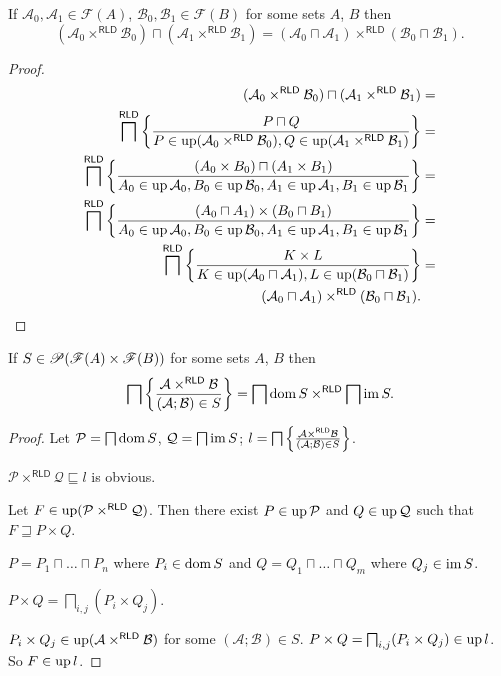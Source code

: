 \begin{thm}
If $\mathcal{A}_{0},\mathcal{A}_{1}\in\mathscr{F}(A)$, $\mathcal{B}_{0},\mathcal{B}_{1}\in\mathscr{F}(B)$
for some sets $A$, $B$ then
\[
\ensuremath{(\mathcal{A}_{0}\times^{\mathsf{RLD}}\mathcal{B}_{0})\sqcap(\mathcal{A}_{1}\times^{\mathsf{RLD}}\mathcal{B}_{1})=(\mathcal{A}_{0}\sqcap\mathcal{A}_{1})\times^{\mathsf{RLD}}(\mathcal{B}_{0}\sqcap\mathcal{B}_{1}).}
\]
\end{thm}
\begin{proof}
~
\begin{align*}
(\mathcal{A}_{0}\times^{\mathsf{RLD}}\mathcal{B}_{0})\sqcap(\mathcal{A}_{1}\times^{\mathsf{RLD}}\mathcal{B}_{1}) & =\\
\bigsqcap^{\mathsf{RLD}}\left\{ \frac{P\sqcap Q}{P\in\operatorname{up}(\mathcal{A}_{0}\times^{\mathsf{RLD}}\mathcal{B}_{0}),Q\in\operatorname{up}(\mathcal{A}_{1}\times^{\mathsf{RLD}}\mathcal{B}_{1})}\right\} & =\\
\bigsqcap^{\mathsf{RLD}}\left\{ \frac{(A_{0}\times B_{0})\sqcap(A_{1}\times B_{1})}{A_{0}\in\operatorname{up}\mathcal{A}_{0},B_{0}\in\operatorname{up}\mathcal{B}_{0},A_{1}\in\operatorname{up}\mathcal{A}_{1},B_{1}\in\operatorname{up}\mathcal{B}_{1}}\right\} & =\\
\bigsqcap^{\mathsf{RLD}}\left\{ \frac{(A_{0}\sqcap A_{1})\times(B_{0}\sqcap B_{1})}{A_{0}\in\operatorname{up}\mathcal{A}_{0},B_{0}\in\operatorname{up}\mathcal{B}_{0},A_{1}\in\operatorname{up}\mathcal{A}_{1},B_{1}\in\operatorname{up}\mathcal{B}_{1}}\right\} & =\\
\bigsqcap^{\mathsf{RLD}}\left\{ \frac{K\times L}{K\in\operatorname{up}(\mathcal{A}_{0}\sqcap\mathcal{A}_{1}),L\in\operatorname{up}(\mathcal{B}_{0}\sqcap\mathcal{B}_{1})}\right\} & =\\
(\mathcal{A}_{0}\sqcap\mathcal{A}_{1})\times^{\mathsf{RLD}}(\mathcal{B}_{0}\sqcap\mathcal{B}_{1}).
\end{align*}
\end{proof}
\begin{thm}
\label{meet-rld-prod}If $S\in\mathscr{P}(\mathscr{F}(A)\times\mathscr{F}(B))$
for some sets $A$, $B$ then
\[
\bigsqcap\left\{ \frac{\mathcal{A}\times^{\mathsf{RLD}}\mathcal{B}}{(\mathcal{A};\mathcal{B})\in S}\right\}=\bigsqcap\operatorname{dom} S\times^{\mathsf{RLD}}\bigsqcap\operatorname{im} S.
\]
\end{thm}
\begin{proof}
Let $\mathcal{P}=\bigsqcap\operatorname{dom} S$, $\mathcal{Q}=\bigsqcap\operatorname{im} S$;
$l=\bigsqcap\left\{ \frac{\mathcal{A}\times^{\mathsf{RLD}}\mathcal{B}}{(\mathcal{A};\mathcal{B})\in S}\right\}$.

$\mathcal{P}\times^{\mathsf{RLD}}\mathcal{Q}\sqsubseteq l$ is obvious.

Let $F\in\operatorname{up}(\mathcal{P}\times^{\mathsf{RLD}}\mathcal{Q})$. Then
there exist $P\in\operatorname{up}\mathcal{P}$ and $Q\in\operatorname{up}\mathcal{Q}$ such that
$F\sqsupseteq P\times Q$.

$P=P_{1}\sqcap\dots\sqcap P_{n}$ where $P_{i}\in\operatorname{dom} S$ and $Q=Q_{1}\sqcap\dots\sqcap Q_{m}$
where $Q_{j}\in\operatorname{im} S$.

$P\times Q=\bigsqcap_{i,j}(P_{i}\times Q_{j})$.

$P_{i}\times Q_{j}\in\operatorname{up}(\mathcal{A}\times^{\mathsf{RLD}}\mathcal{B})$
for some $(\mathcal{A};\mathcal{B})\in S$. $P\times Q=\bigsqcap_{i,j}(P_{i}\times Q_{j})\in\operatorname{up} l$.
So $F\in\operatorname{up} l$.\end{proof}
